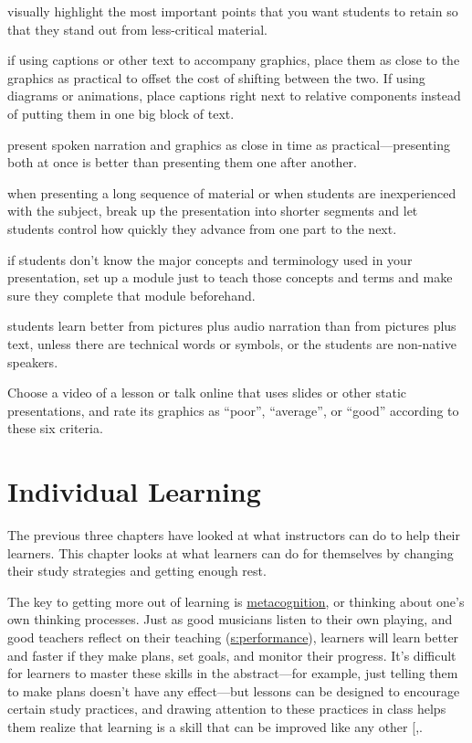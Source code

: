 \begin{description}
\tightlist
\item[Signalling:]
visually highlight the most important points that you want students
to retain so that they stand out from less-critical material.
\item[Spatial contiguity:]
if using captions or other text to accompany graphics, place them as
close to the graphics as practical to offset the cost of shifting
between the two. If using diagrams or animations, place captions
right next to relative components instead of putting them in one big
block of text.
\item[Temporal contiguity:]
present spoken narration and graphics as close in time as
practical---presenting both at once is better than presenting them
one after another.
\item[Segmenting:]
when presenting a long sequence of material or when students are
inexperienced with the subject, break up the presentation into
shorter segments and let students control how quickly they advance
from one part to the next.
\item[Pretraining:]
if students don't know the major concepts and terminology used in
your presentation, set up a module just to teach those concepts and
terms and make sure they complete that module beforehand.
\item[Modality:]
students learn better from pictures plus audio narration than from
pictures plus text, unless there are technical words or symbols, or
the students are non-native speakers.
\end{description}

Choose a video of a lesson or talk online that uses slides or other
static presentations, and rate its graphics as ``poor'', ``average'', or
``good'' according to these six criteria.

\chapter{Individual Learning}\label{s:individual}

The previous three chapters have looked at what instructors can do to
help their learners. This chapter looks at what learners can do for
themselves by changing their study strategies and getting enough rest.

The key to getting more out of learning is
\protect\hyperlink{g:metacognition}{metacognition}, or thinking about one's
own thinking processes. Just as good musicians listen to their own
playing, and good teachers reflect on their teaching
(\protect\hyperlink{CHAPTER}{s:performance}), learners will learn better and faster if
they make plans, set goals, and monitor their progress. It's difficult
for learners to master these skills in the abstract---for example, just
telling them to make plans doesn't have any effect---but lessons can be
designed to encourage certain study practices, and drawing attention to
these practices in class helps them realize that learning is a skill
that can be improved like any other {[},\protect[\hyperlink{b:Miya2018}{Miya2018}]{]}.

